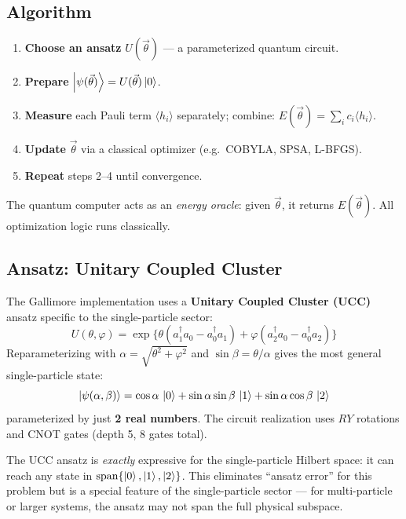 \documentclass[11pt,a4paper]{article}
\begin{document}
\subsection{Algorithm}

\begin{enumerate}[nosep]
  \item \textbf{Choose an ansatz} $U(\vec\theta)$ --- a parameterized
    quantum circuit.
  \item \textbf{Prepare} $\ket{\psi(\vec\theta)} = U(\vec\theta)\ket{0}$.
  \item \textbf{Measure} each Pauli term $\langle h_i \rangle$ separately;
    combine: $E(\vec\theta) = \sum_i c_i \langle h_i \rangle$.
  \item \textbf{Update} $\vec\theta$ via a classical optimizer (e.g.\
    COBYLA, SPSA, L-BFGS).
  \item \textbf{Repeat} steps 2--4 until convergence.
\end{enumerate}

The quantum computer acts as an \emph{energy oracle}: given $\vec\theta$, it
returns $E(\vec\theta)$.  All optimization logic runs classically.

\subsection{Ansatz: Unitary Coupled Cluster}

The Gallimore implementation uses a \textbf{Unitary Coupled Cluster (UCC)}
ansatz specific to the single-particle sector:
\begin{equation}
  U(\theta,\varphi) = \exp\bigl\{
    \theta(a_1^\dagger a_0 - a_0^\dagger a_1)
    + \varphi(a_2^\dagger a_0 - a_0^\dagger a_2)\bigr\}
  \label{eq:ucc}
\end{equation}
Reparameterizing with $\alpha = \sqrt{\theta^2+\varphi^2}$ and
$\sin\beta = \theta/\alpha$ gives the most general single-particle state:
\begin{equation}
  \ket{\psi(\alpha,\beta)} = \cos\alpha\,\ket{0}
    + \sin\alpha\sin\beta\,\ket{1}
    + \sin\alpha\cos\beta\,\ket{2}
  \label{eq:ucc_state}
\end{equation}
parameterized by just \textbf{2 real numbers}.  The circuit realization
uses $RY$ rotations and CNOT gates (depth 5, 8 gates total).

\begin{keybox}
The UCC ansatz is \emph{exactly} expressive for the single-particle Hilbert
space: it can reach any state in $\text{span}\{\ket{0},\ket{1},\ket{2}\}$.
This eliminates ``ansatz error'' for this problem but is a special feature of
the single-particle sector --- for multi-particle or larger systems, the
ansatz may not span the full physical subspace.
\end{keybox}
\end{document}
